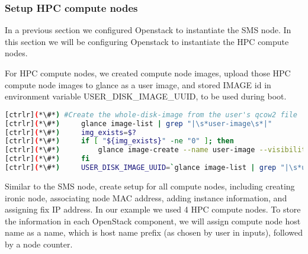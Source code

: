 \subsubsection{Setup HPC compute nodes}

	In a previous section we configured Openstack to instantiate the SMS node. In this section we will be configuring Openstack to instantiate the HPC compute nodes.

	For HPC compute nodes, we created compute node images, upload those HPC compute node images to glance as a user image, and stored IMAGE id in environment variable USER\_DISK\_IMAGE\_UUID, to be used during boot.


\begin{lstlisting}[language=bash,keywords={}]
[ctrlr](*\#*) #Create the whole-disk-image from the user's qcow2 file
[ctrlr](*\#*)     glance image-list | grep "|\s*user-image\s*|"
[ctrlr](*\#*)     img_exists=$?
[ctrlr](*\#*)     if [ "${img_exists}" -ne "0" ]; then
[ctrlr](*\#*)         glance image-create --name user-image --visibility public --disk-format qcow2 --container-format bare < ${chpc_image_user}
[ctrlr](*\#*)     fi
[ctrlr](*\#*)     USER_DISK_IMAGE_UUID=`glance image-list | grep "|\s*user-image\s*|" | awk '{print $2}'`
\end{lstlisting} 


	Similar to the SMS node, create setup for all compute nodes, including creating ironic node, associating node MAC address, adding instance information, and assigning fix IP address. In our example we used 4 HPC compute nodes. To store the information in each OpenStack component, we will assign compute node host name as a name, which is host name prefix (as chosen by user in inputs), followed by a node counter. 


